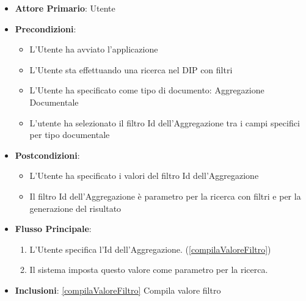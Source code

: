 \begin{itemize}
      \item \textbf{Attore Primario}: Utente
      \item \textbf{Precondizioni}: 
      \begin{itemize}
            \item L'Utente ha avviato l'applicazione
            \item L'Utente sta effettuando una ricerca nel DIP con filtri
            \item L'Utente ha specificato come tipo di documento: Aggregazione Documentale
            \item L'utente ha selezionato il filtro Id dell'Aggregazione tra i campi specifici per tipo documentale
      \end{itemize}
      \item \textbf{Postcondizioni}: \begin{itemize}
            \item L'Utente ha specificato i valori del filtro Id dell'Aggregazione
            \item Il filtro Id dell'Aggregazione è parametro per la ricerca con filtri e per la generazione del risultato
      \end{itemize}
      \item \textbf{Flusso Principale}:
            \begin{enumerate}
                  \item L'Utente specifica l'Id dell'Aggregazione. (\ref{compilaValoreFiltro})
                  \item Il sistema imposta questo valore come parametro per la ricerca.
            \end{enumerate}
      \item \textbf{Inclusioni}: \ref{compilaValoreFiltro} Compila valore filtro
\end{itemize}

